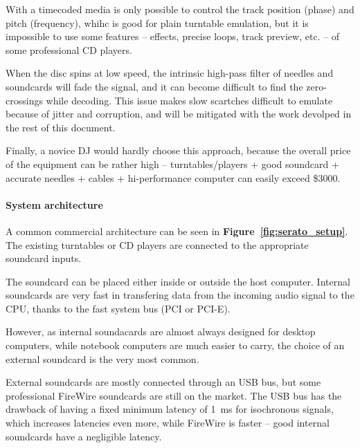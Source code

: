 \documentclass[a4paper,10pt]{article}
\newcommand{\citef}[1]{\textbf{Figure~\ref{#1}}}
\begin{document}
\begin{multicols}{2}
With a timecoded media is only possible to control the track position (phase)
and pitch (frequency), whihc is good for plain turntable emulation, but it is
impossible to use some features -- effects, precise loops, track preview, etc.
-- of some professional CD players.

When the disc spins at low speed, the intrinsic high-pass filter of needles
and soundcards will fade the signal, and it can become difficult to find the
zero-crossings while decoding. This issue makes slow scartches difficult to
emulate because of jitter and corruption, and will be mitigated with the work
devolped in the rest of this document.

Finally, a novice DJ would hardly choose this approach, because the overall
price of the equipment can be rather high -- turntables/players + good
soundcard + accurate needles + cables + hi-performance computer can easily
exceed \$3000. 


\paragraph{System architecture}
A common commercial architecture \cite{rane_ssl} \cite{ni_tsp} can be seen in
\citef{fig:serato_setup}. The existing turntables or CD players are connected
to the appropriate soundcard inputs.

The soundcard can be placed either inside or outside the host computer.
Internal soundcards are very fast in transfering data from the incoming audio
signal to the CPU, thanks to the fast system bus (PCI or PCI-E).

However, as internal soundacards are almost always designed for desktop
computers, while notebook computers are much easier to carry, the choice of an
external soundcard is the very most common.

External soundcards are mostly connected through an USB bus, but some
professional FireWire soundcards are still on the market. The USB bus has the
drawback of having a fixed minimum latency of 1~ms for isochronous signals,
which increases latencies even more, while FireWire is faster -- good internal
soundcards have a negligible latency.


\end{multicols}
\end{document}
